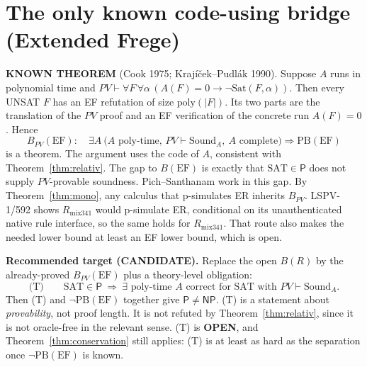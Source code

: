 \documentclass[11pt]{article}
\theoremstyle{definition}
\newcommand{\Pclass}{\mathsf{P}}
\newcommand{\NP}{\mathsf{NP}}
\newcommand{\SAT}{\mathrm{SAT}}
\newcommand{\PB}{\mathrm{PB}}
\begin{document}
\section{The only known code-using bridge (Extended Frege)}\label{sec:ef}
\textbf{KNOWN THEOREM} (Cook 1975; Krajíček--Pudlák 1990). Suppose $A$ runs in
polynomial time and $PV\vdash\forall F\,\forall\alpha\,(A(F)=0\rightarrow
\neg\mathrm{Sat}(F,\alpha))$. Then every UNSAT $F$ has an EF refutation of size
$\mathrm{poly}(|F|)$. Its two parts are the translation of the $PV$ proof and
an EF verification of the concrete run $A(F)=0$. Hence
\[
B_{PV}(\mathrm{EF}):\quad
\exists A\ \bigl(A\text{ poly-time, } PV\vdash\mathrm{Sound}_A,\ A\text{ complete}\bigr)
\Longrightarrow\PB(\mathrm{EF})
\]
is a theorem. The argument uses the code of $A$, consistent with
Theorem~\ref{thm:relativ}. The gap to $B(\mathrm{EF})$ is exactly that
$\SAT\in\Pclass$ does not supply $PV$-provable soundness. Pich--Santhanam work
in this gap. By Theorem~\ref{thm:mono}, any calculus that p-simulates ER
inherits $B_{PV}$. LSPV-1/592 shows $R_{\mathrm{mix341}}$ would p-simulate ER,
conditional on its unauthenticated native rule interface, so the same holds
for $R_{\mathrm{mix341}}$. That route also makes the needed lower bound at
least an EF lower bound, which is open.

\textbf{Recommended target (CANDIDATE).} Replace the open $B(R)$ by the
already-proved $B_{PV}(\mathrm{EF})$ plus a theory-level obligation:
\[
\text{(T)}\qquad \SAT\in\Pclass\ \Longrightarrow\ \exists\text{ poly-time }A
\text{ correct for SAT with } PV\vdash\mathrm{Sound}_A .
\]
Then (T) and $\neg\PB(\mathrm{EF})$ together give $\Pclass\neq\NP$. (T) is a
statement about \emph{provability}, not proof length. It is not refuted by
Theorem~\ref{thm:relativ}, since it is not oracle-free in the relevant sense.
(T) is \textbf{OPEN}, and Theorem~\ref{thm:conservation} still applies: (T) is
at least as hard as the separation once $\neg\PB(\mathrm{EF})$ is known.
\end{document}
